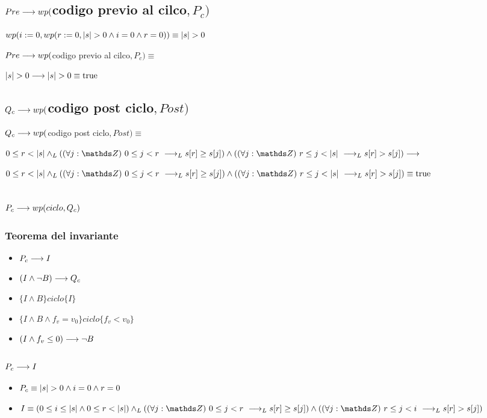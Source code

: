 \documentclass{article}
\begin{document}
\subsection*{$Pre \longrightarrow wp($codigo previo al cilco$,P_{c})$}

    $wp(i:=0, wp(r:= 0, |s| > 0 \wedge i = 0 \wedge r = 0)) \equiv |s| > 0$

    $Pre \longrightarrow wp($codigo previo al cilco$,P_{c}) \equiv$

    $ |s| > 0 \longrightarrow |s| > 0 \equiv \mathrm{true} $

\subsection*{$Q_{c} \longrightarrow wp($codigo post ciclo$,Post)$}

    $Q_{c} \longrightarrow wp($codigo post ciclo$,Post) \equiv$

    $0 \leq r < \longitud{s} \yLuego (\paraTodo{j}{0}{r} \implicaLuego s[r] \geq s[j]) \wedge (\paraTodo{j}{r}{\longitud{s}}\implicaLuego s[r] > s[j]) \implica$

    $0 \leq r < \longitud{s} \yLuego (\paraTodo{j}{0}{r} \implicaLuego s[r] \geq s[j]) \wedge (\paraTodo{j}{r}{\longitud{s}}\implicaLuego s[r] > s[j]) \equiv \True$

\subsection*{$P_{c} \longrightarrow wp(ciclo, Q_{c})$}
\subsubsection*{Teorema del invariante}
\begin{itemize}
    \item $ P_{c} \longrightarrow I $
    \item $ (I \wedge \neg B) \longrightarrow Q_{c} $
    \item $ \{I \wedge B\} ciclo \{I\} $
    \item $ \{I \wedge B \wedge f_{v}=v_{0}\} ciclo \{f_{v}<v_{0}\} $
    \item $ (I \wedge f_{v} \leq 0) \longrightarrow \neg B$
\end{itemize}
\subsubsection*{$ P_{c} \longrightarrow I $}

\begin{itemize}
    \item $P_{c}    \equiv |s| > 0 \wedge i = 0 \wedge r = 0$
    \item $I        \equiv (0 \leq i \leq \longitud{s} \wedge 0 \leq r < \longitud{s}) \yLuego (\paraTodo{j}{0}{r} \implicaLuego s[r] \geq s[j]) \wedge (\paraTodo{j}{r}{i}\implicaLuego s[r] > s[j])$
\end{itemize}
\end{document}
